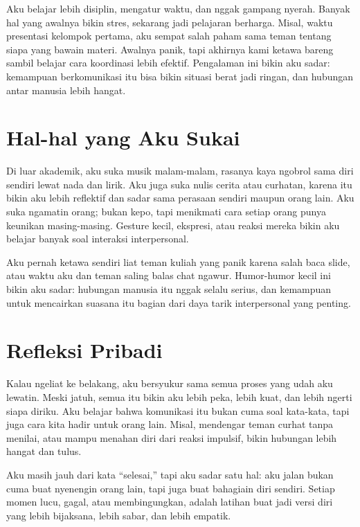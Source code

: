 \documentclass[
  letterpaper,
  DIV=11,
  numbers=noendperiod]{scrreprt}
\begin{document}
Aku belajar lebih disiplin, mengatur waktu, dan nggak gampang nyerah.
Banyak hal yang awalnya bikin stres, sekarang jadi pelajaran berharga.
Misal, waktu presentasi kelompok pertama, aku sempat salah paham sama
teman tentang siapa yang bawain materi. Awalnya panik, tapi akhirnya
kami ketawa bareng sambil belajar cara koordinasi lebih efektif.
Pengalaman ini bikin aku sadar: kemampuan berkomunikasi itu bisa bikin
situasi berat jadi ringan, dan hubungan antar manusia lebih hangat.

\section{Hal-hal yang Aku Sukai}\label{hal-hal-yang-aku-sukai}

Di luar akademik, aku suka musik malam-malam, rasanya kaya ngobrol sama
diri sendiri lewat nada dan lirik. Aku juga suka nulis cerita atau
curhatan, karena itu bikin aku lebih reflektif dan sadar sama perasaan
sendiri maupun orang lain. Aku suka ngamatin orang; bukan kepo, tapi
menikmati cara setiap orang punya keunikan masing-masing. Gesture kecil,
ekspresi, atau reaksi mereka bikin aku belajar banyak soal interaksi
interpersonal.

Aku pernah ketawa sendiri liat teman kuliah yang panik karena salah baca
slide, atau waktu aku dan teman saling balas chat ngawur. Humor-humor
kecil ini bikin aku sadar: hubungan manusia itu nggak selalu serius, dan
kemampuan untuk mencairkan suasana itu bagian dari daya tarik
interpersonal yang penting.

\section{Refleksi Pribadi}\label{refleksi-pribadi}

Kalau ngeliat ke belakang, aku bersyukur sama semua proses yang udah aku
lewatin. Meski jatuh, semua itu bikin aku lebih peka, lebih kuat, dan
lebih ngerti siapa diriku. Aku belajar bahwa komunikasi itu bukan cuma
soal kata-kata, tapi juga cara kita hadir untuk orang lain. Misal,
mendengar teman curhat tanpa menilai, atau mampu menahan diri dari
reaksi impulsif, bikin hubungan lebih hangat dan tulus.

Aku masih jauh dari kata ``selesai,'' tapi aku sadar satu hal: aku jalan
bukan cuma buat nyenengin orang lain, tapi juga buat bahagiain diri
sendiri. Setiap momen lucu, gagal, atau membingungkan, adalah latihan
buat jadi versi diri yang lebih bijaksana, lebih sabar, dan lebih
empatik.
\end{document}
